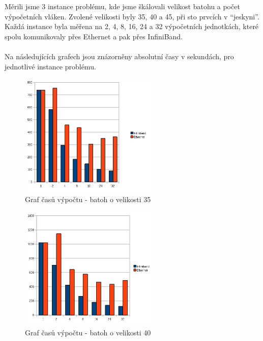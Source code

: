 \documentclass[12pt]{article}
\begin{document}
Měrili jsme 3 instance problému, kde jsme škálovali velikost batohu a počet výpočetních vláken. Zvolené velikosti byly 35, 40 a 45, při sto prvcích v ``jeskyni''. Každá instance byla měřena na 2, 4, 8, 16, 24 a 32 výpočetních jednotkách, které spolu komunikovaly přes Ethernet a pak přes InfiniBand.\\
\\
Na následujících grafech jsou znázorněny absolutní časy v sekundách, pro jednotlivé instance problému.

\begin{figure}[H]
\begin{center}
\includegraphics[width=0.6\textwidth]{par/35}
\caption{Graf časů výpočtu - batoh o velikosti 35}
\label{fig:problem_35}
\end{center}
\end{figure}

\begin{figure}[H]
\begin{center}
\includegraphics[width=0.6\textwidth]{par/40}
\caption{Graf časů výpočtu - batoh o velikosti 40}
\label{fig:problem_40}
\end{center}
\end{figure}
\end{document}
